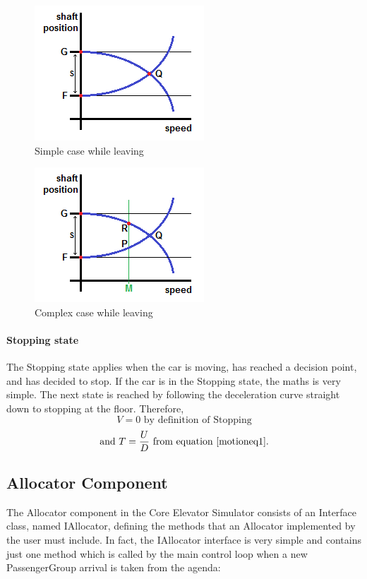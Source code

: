 \documentclass{UoYCSproject}
\begin{document}
\begin{figure} [h]
	\centering
	\includegraphics{leaving_simp.png}
	\caption{Simple case while leaving}
	\label{leavingsimp}
\end{figure}

\begin{figure} [h]
	\centering
	\includegraphics{leaving_comp.png}
	\caption{Complex case while leaving}
	\label{leavingcomp}
\end{figure}

\paragraph{Stopping state}

The Stopping state applies when the car is moving, has reached a decision point, and has decided to stop.  If the car is in the Stopping state, the maths is very simple.  The next state is reached by following the deceleration curve straight down to stopping at the floor.  Therefore,
\[ V=0 \text{ by definition of Stopping} \]
\[ \text{and } T=\frac{U}{D} \text{ from equation \ref{motioneq1}.} \]

\subsection{Allocator Component}

The Allocator component in the Core Elevator Simulator consists of an Interface class, named IAllocator, defining the methods that an Allocator implemented by the user must include.  In fact, the IAllocator interface is very simple and contains just one method which is called by the main control loop when a new PassengerGroup arrival is taken from the agenda:
\end{document}
